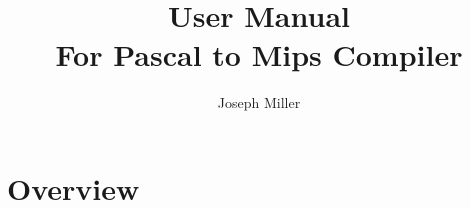 \documentclass[english]{article}
\begin{document}
\title{ User Manual \\
  \large For Pascal to Mips Compiler}

\author{Joseph Miller}
\maketitle


\section{Overview}
\end{document}
